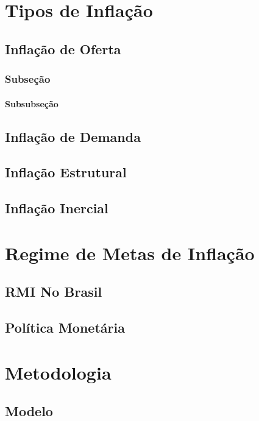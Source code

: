 \documentclass[12pt,oneside,a4paper,chapter=TITLE,english,brazil,sumario=abnt-6027-2012]{abntex2}
\begin{document}
\chapter{Tipos de Inflação}

\section{Inflação de Oferta}

\subsection{Subseção}

\subsubsection{Subsubseção}

\section{Inflação de Demanda}

\section{Inflação Estrutural}

\section{Inflação Inercial}

\chapter{Regime de Metas de Inflação}

\section{RMI No Brasil}

\section{Política Monetária}

\chapter{Metodologia}

\section{Modelo}
\end{document}
